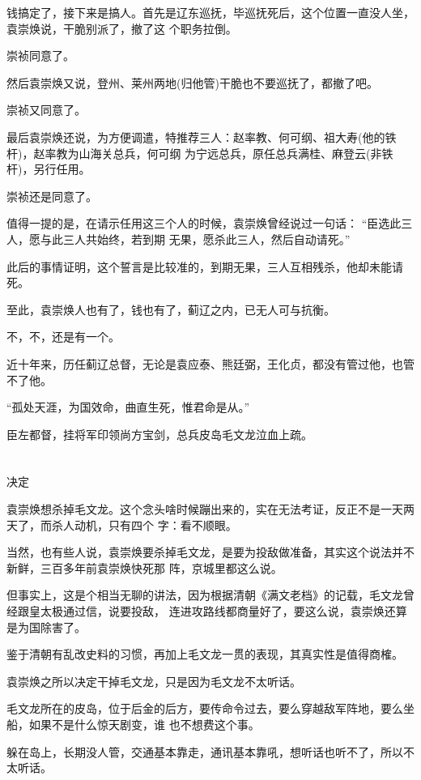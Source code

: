 \documentclass[11pt,a4paper,onecolumn]{article}
\begin{document}
钱搞定了，接下来是搞人。首先是辽东巡抚，毕巡抚死后，这个位置一直没人坐，袁崇焕说，干脆别派了，撤了这
个职务拉倒。

崇祯同意了。

然后袁崇焕又说，登州、莱州两地(归他管)干脆也不要巡抚了，都撤了吧。

崇祯又同意了。

最后袁崇焕还说，为方便调遣，特推荐三人：赵率教、何可纲、祖大寿(他的铁杆)，赵率教为山海关总兵，何可纲
为宁远总兵，原任总兵满桂、麻登云(非铁杆)，另行任用。

崇祯还是同意了。

值得一提的是，在请示任用这三个人的时候，袁崇焕曾经说过一句话： ``臣选此三人，愿与此三人共始终，若到期
无果，愿杀此三人，然后自动请死。''

此后的事情证明，这个誓言是比较准的，到期无果，三人互相残杀，他却未能请死。

至此，袁崇焕人也有了，钱也有了，蓟辽之内，已无人可与抗衡。

不，不，还是有一个。

近十年来，历任蓟辽总督，无论是袁应泰、熊廷弼，王化贞，都没有管过他，也管不了他。

``孤处天涯，为国效命，曲直生死，惟君命是从。''

臣左都督，挂将军印领尚方宝剑，总兵皮岛毛文龙泣血上疏。

\section[\thesection]{}

决定

袁崇焕想杀掉毛文龙。这个念头啥时候蹦出来的，实在无法考证，反正不是一天两天了，而杀人动机，只有四个
字：看不顺眼。

当然，也有些人说，袁崇焕要杀掉毛文龙，是要为投敌做准备，其实这个说法并不新鲜，三百多年前袁崇焕快死那
阵，京城里都这么说。

但事实上，这是个相当无聊的讲法，因为根据清朝《满文老档》的记载，毛文龙曾经跟皇太极通过信，说要投敌，
连进攻路线都商量好了，要这么说，袁崇焕还算是为国除害了。

鉴于清朝有乱改史料的习惯，再加上毛文龙一贯的表现，其真实性是值得商榷。

袁崇焕之所以决定干掉毛文龙，只是因为毛文龙不太听话。

毛文龙所在的皮岛，位于后金的后方，要传命令过去，要么穿越敌军阵地，要么坐船，如果不是什么惊天剧变，谁
也不想费这个事。

躲在岛上，长期没人管，交通基本靠走，通讯基本靠吼，想听话也听不了，所以不太听话。
\end{document}
